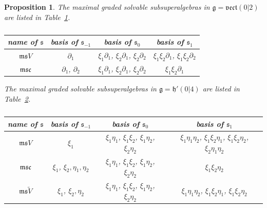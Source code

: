 \documentclass[pdftex]{sigma}
\newcommand {\fc} {{\mathfrak{c}}}
\newcommand {\fg} {{\mathfrak{g}}} %
\newcommand {\fh} {{\mathfrak{h}}}
\newcommand {\fm} {{\mathfrak{m}}}
\newcommand {\fs} {{\mathfrak{s}}}
\newcommand {\fvect} {{\mathfrak{vect}}} %
\newcommand {\<} [2] {{\left.\vphantom{#2}\right.^{#1\!}\!{#2}}}
\numberwithin{equation}{section}
\newtheorem{Proposition}[Theorem]{Proposition}
\begin{document}
\begin{Proposition}\label{P5} The maximal graded solvable subsuperalgebras in $\fg=\fvect(0|2)$ are listed in Table~{\rm \ref{vect02}}.
\begin{table}[h]\centering \renewcommand{\arraystretch}{1.2}
\begin{tabular}{|c|c|c|c|}
\hline
name of $\fs$ & basis of $\fs_{-1}$ & basis of $\fs_0$ & basis of $\fs_1$\\
\hline
$\fm\fs V$ & $\partial_1 $ & $\xi_1\partial_1$, $\xi_2\partial_1$, $\xi_2\partial_2$ & $\xi_1\xi_2\partial_1$, $\xi_1\xi_2\partial_2$ \\
\hline
$\fm\fs\fc$ & $\partial_1$, $\partial_2 $ & $\xi_1\partial_1$, $\xi_2\partial_1$, $\xi_2\partial_2$ & $\xi_1\xi_2\partial_1$ \\
\hline
\end{tabular}
\caption{}\label{vect02}
\end{table}

The maximal graded solvable subsuperalgebras in $\fg=\fh'(0|4)$ are listed in Table~{\rm \ref{h04}}.
\begin{table}[h]\centering \renewcommand{\arraystretch}{1.2}
\begin{tabular}{|c|c|c|c|}
\hline
name of $\fs$ & basis of $\fs_{-1}$ & basis of $\fs_0$ & basis of $\fs_1$\\
\hline
$\fm\fs V$ & $\xi_1 $ & $\xi_1\eta_1$, $\xi_1\xi_2$, $\xi_1\eta_2$, $\xi_2\eta_2$ & $\xi_1\eta_1\eta_2$, $\xi_1\xi_2\eta_1$, $\xi_1\xi_2\eta_2$, $\xi_2\eta_1\eta_2$ \\
\hline
$\fm\fs\fc$ & $\xi_1$, $\xi_2,\eta_1,\eta_2 $ & $\xi_1\eta_1$, $\xi_1\xi_2$, $\xi_1\eta_2$, $\xi_2\eta_2$ & $\xi_1\xi_2\eta_2$ \\
\hline
$\fm\fs\widetilde V$ & $\xi_1$, $\xi_2,\eta_2 $ & $\xi_1\eta_1$, $\xi_1\xi_2$, $\xi_1\eta_2$, $\xi_2\eta_2$ & $\xi_1\eta_1\eta_2$, $\xi_1\xi_2\eta_1$, $\xi_1\xi_2\eta_2$ \\
\hline
\end{tabular}
\caption{}\label{h04}
\end{table}
\end{Proposition}
\end{document}
